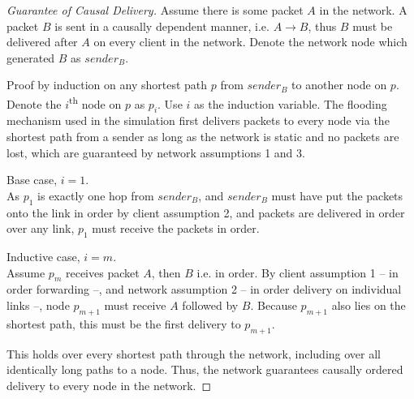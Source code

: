 \documentclass[12pt,a4paper,twoside,openright]{report}
\begin{document}
		\begin{proof}[Guarantee of Causal Delivery]
		
		Assume there is some packet $A$ in the network. A packet $B$ is sent in a causally dependent manner, i.e. $A \rightarrow B$, thus $B$ must be delivered after $A$ on every client in the network. Denote the network node which generated $B$ as $sender_B$.
		
		Proof by induction on any shortest path $p$ from $sender_B$ to another node on $p$. Denote the $i$\textsuperscript{th} node on $p$ as $p_i$. Use $i$ as the induction variable. The flooding mechanism used in the simulation first delivers packets to every node via the shortest path from a sender as long as the network is static and no packets are lost, which are guaranteed by network assumptions 1 and 3.
		
		Base case, $i = 1$.\\
		As $p_1$ is exactly one hop from $sender_B$, and $sender_B$ must have put the packets onto the link in order by client assumption 2, and packets are delivered in order over any link, $p_1$ must receive the packets in order.
		
		Inductive case, $i = m$.\\
		Assume $p_m$ receives packet $A$, then $B$ i.e. in order. By client assumption 1 -- in order forwarding --, and network assumption 2 -- in order delivery on individual links --, node $p_{m+1}$ must receive $A$ followed by $B$. Because $p_{m+1}$ also lies on the shortest path, this must be the first delivery to $p_{m+1}$.
		
		This holds over every shortest path through the network, including over all identically long paths to a node. Thus, the network guarantees causally ordered delivery to every node in the network.
		
		
		

\end{proof}
\end{document}
